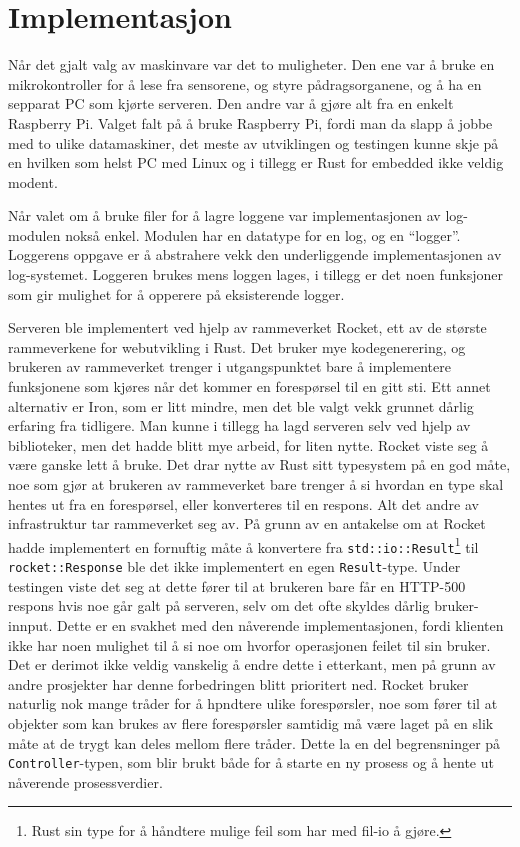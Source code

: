 \section{Implementasjon}

Når det gjalt valg av maskinvare var det to muligheter. Den ene var å bruke en mikrokontroller for å lese fra sensorene, og styre pådragsorganene, og å ha en sepparat PC som kjørte serveren. Den andre var å gjøre alt fra en enkelt Raspberry Pi. Valget falt på å bruke Raspberry Pi, fordi man da slapp å jobbe med to ulike datamaskiner, det meste av utviklingen og testingen kunne skje på en hvilken som helst PC med Linux og i tillegg er Rust for embedded ikke veldig modent.

Når valet om å bruke filer for å lagre loggene var implementasjonen av log-modulen nokså enkel. Modulen har en datatype for en log, og en ``logger''. Loggerens oppgave er å abstrahere vekk den underliggende implementasjonen av log-systemet. Loggeren brukes mens loggen lages, i tillegg er det noen funksjoner som gir mulighet for å opperere på eksisterende logger.

Serveren ble implementert ved hjelp av rammeverket Rocket, ett av de største rammeverkene for webutvikling i Rust. Det bruker mye kodegenerering, og brukeren av rammeverket trenger i utgangspunktet bare å implementere funksjonene som kjøres når det kommer en forespørsel til en gitt sti. Ett annet alternativ er Iron, som er litt mindre, men det ble valgt vekk grunnet dårlig erfaring fra tidligere. Man kunne i tillegg ha lagd serveren selv ved hjelp av biblioteker, men det hadde blitt mye arbeid, for liten nytte. Rocket viste seg å være ganske lett å bruke. Det drar nytte av Rust sitt typesystem på en god måte, noe som gjør at brukeren av rammeverket bare trenger å si hvordan en type skal hentes ut fra en forespørsel, eller konverteres til en respons. Alt det andre av infrastruktur tar rammeverket seg av. På grunn av en antakelse om at Rocket hadde implementert en fornuftig måte å konvertere fra \texttt{std::io::Result}\footnote{Rust sin type for å håndtere mulige feil som har med fil-io å gjøre.} til \texttt{rocket::Response} ble det ikke implementert en egen \texttt{Result}-type. Under testingen viste det seg at dette fører til at brukeren bare får en HTTP-500 respons hvis noe går galt på serveren, selv om det ofte skyldes dårlig bruker-innput. Dette er en svakhet med den nåverende implementasjonen, fordi klienten ikke har noen mulighet til å si noe om hvorfor operasjonen feilet til sin bruker. Det er derimot ikke veldig vanskelig å endre dette i etterkant, men på grunn av andre prosjekter har denne forbedringen blitt prioritert ned. Rocket bruker naturlig nok mange tråder for å hpndtere ulike forespørsler, noe som fører til at objekter som kan brukes av flere forespørsler samtidig må være laget på en slik måte at de trygt kan deles mellom flere tråder. Dette la en del begrensninger på \texttt{Controller}-typen, som blir brukt både for å starte en ny prosess og å hente ut nåverende prosessverdier.

